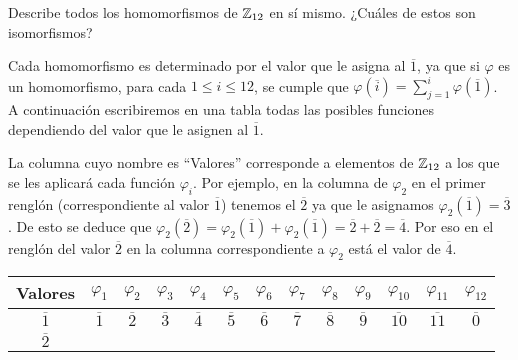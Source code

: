 Describe todos los homomorfismos de \( \mathbb{Z}_{12} \) en sí mismo.
¿Cuáles de estos son isomorfismos?
\begin{solution}
    Cada homomorfismo es determinado por el valor que le asigna al \( \overline{1} \), ya 
    que si \( \varphi \) es un homomorfismo, para cada \( 1 \leq i \leq 12 \), se
    cumple que
    \( \varphi \left( \overline{i} \right) = \sum_{j=1}^{i} \varphi \left( \overline{1} \right) \).
    A continuación escribiremos en una tabla todas las posibles funciones dependiendo 
    del valor que le 
    asignen al \( \overline{1} \).

    La columna cuyo nombre es ``Valores'' corresponde a elementos de \( \mathbb{Z}_{12} \) a los que 
    se les aplicará cada función \( \varphi_i \). Por ejemplo, en la columna de \( \varphi_2 \) 
    en el primer renglón (correspondiente al valor \( \overline{1} \)) tenemos el \( \overline{2} \) 
    ya que le asignamos \( \varphi_2 \left( \overline{1} \right) = \overline{3} \). De esto se 
    deduce que \( \varphi_{2} \left( \overline{2} \right) = \varphi_2 \left( \overline{1} \right) 
    + \varphi_2 \left( \overline{1} \right) = \overline{2} + \overline{2}= \overline{4}\). Por 
    eso en el renglón del valor \( \overline{2} \) en la columna correspondiente a \( \varphi_2 \) 
    está el valor de \( \overline{4} \).
    \begin{center}
        \begin{tabular}{|c||c|c|c|c|c|c|c|c|c|c|c|c|}
            \hline
            Valores &
            \( \varphi_1 \) &
            \( \varphi_2 \) &
            \( \varphi_3 \) &
            \( \varphi_4 \) &
            \( \varphi_5 \) &
            \( \varphi_6 \) &
            \( \varphi_7 \) &
            \( \varphi_8 \) &
            \( \varphi_9 \) &
            \( \varphi_{10} \) &
            \( \varphi_{11} \) &
            \( \varphi_{12} \) \\
            \hline
            \hline
            \( \overline{1} \) &
            \( \overline{1} \) &
            \( \overline{2} \) &
            \( \overline{3} \) &
            \( \overline{4} \) &
            \( \overline{5} \) &
            \( \overline{6} \) &
            \( \overline{7} \) &
            \( \overline{8} \) &
            \( \overline{9} \) &
            \( \overline{10} \) &
            \( \overline{11} \) &
            \( \overline{0} \) \\
            \hline
            \( \overline{2} \) &

\end{tabular}
\end{center}
\end{solution}
